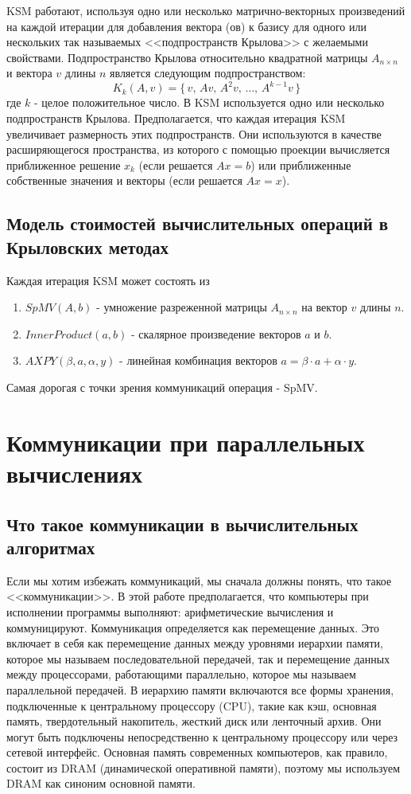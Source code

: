 \documentclass[a4paper,12pt]{report}
\begin{document}
    KSM работают, используя одно или несколько матрично-векторных произведений на каждой итерации для добавления вектора (ов) к базису для одного или нескольких так называемых <<подпространств Крылова>> с желаемыми свойствами. Подпространство Крылова относительно квадратной матрицы $A_{n \times n}$ и вектора $v$ длины $n$ является следующим подпространством:
    $$ K_k(A, v) = \{\, v,\, Av,\, A^2v,\, \ldots,\, A^{k-1}v\, \}$$
    где $k$ - целое положительное число. В KSM используется одно или несколько подпространств Крылова. Предполагается, что каждая итерация KSM увеличивает размерность этих подпространств. Они используются в качестве расширяющегося пространства, из которого с помощью проекции вычисляется приближенное решение $x_k$ (если решается $Ax = b$) или приближенные собственные значения и векторы (если решается $Ax = x$).
    
    \section{ Модель стоимостей вычислительных операций в Крыловских методах }
    Каждая итерация KSM может состоять из
    \begin{enumerate}
        \item $SpMV(A, b)$ - умножение разреженной матрицы $A_{n \times n}$ на вектор $v$ длины $n$.
        \item $InnerProduct(a, b)$ - скалярное произведение векторов $a$ и $b$.
        \item $AXPY(\beta, a, \alpha, y)$ - линейная комбинация векторов $a = \beta \cdot a + \alpha \cdot y$. 
    \end{enumerate}

    Самая дорогая с точки зрения коммуникаций операция - SpMV. 
    
    \chapter{ Коммуникации при параллельных вычислениях}

    \section{Что такое коммуникации в вычислительных алгоритмах}
    Если мы хотим избежать коммуникаций, мы сначала должны понять, что такое <<коммуникации>>. В этой работе предполагается, что компьютеры при исполнении программы выполняют: арифметические вычисления и коммуницируют. Коммуникация определяется как перемещение данных. Это включает в себя как перемещение данных между уровнями иерархии памяти, которое мы называем последовательной передачей, так и перемещение данных между процессорами, работающими параллельно, которое мы называем параллельной передачей. В иерархию памяти включаются все формы хранения, подключенные к центральному процессору (CPU), такие как кэш, основная память, твердотельный накопитель, жесткий диск или ленточный архив. Они могут быть подключены непосредственно к центральному процессору или через сетевой интерфейс. Основная память современных компьютеров, как правило, состоит из DRAM (динамической оперативной памяти), поэтому мы используем DRAM как синоним основной памяти.      
\end{document}
